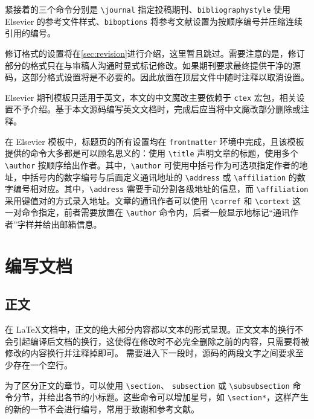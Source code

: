 紧接着的三个命令分别是 \verb|\journal| 指定投稿期刊、\verb|bibliographystyle| 使用 Elsevier 的参考文件样式、\verb|biboptions| 将参考文献设置为按顺序编号并压缩连续引用的编号。


修订格式的设置将在\cref{sec:revision}进行介绍，这里暂且跳过。需要注意的是，修订部分的格式只在与审稿人沟通时显式标记修改。如果期刊要求最终提供干净的源码，这部分格式设置将是不必要的。因此放置在顶层文件中随时注释以取消设置。


Elsevier 期刊模板只适用于英文，本文的中文魔改主要依赖于 \verb|ctex| 宏包，相关设置不予介绍。基于本文源码编写英文文档时，完成后应当将中文魔改部分删除或注释。


在 Elsevier 模板中，标题页的所有设置均在 \verb|frontmatter| 环境中完成，且该模板提供的命令大多都是可以顾名思义的：使用 \verb|\title| 声明文章的标题，使用多个 \verb|\author| 按顺序给出作者。其中，\verb|\author| 可使用中括号作为可选项指定作者的地址，中括号内的数字编号与后面定义通讯地址的 \verb|\address| 或 \verb|\affiliation| 的数字编号相对应。其中，\verb|\address| 需要手动分割各级地址的信息，而 \verb|\affiliation| 采用键值对的方式录入地址。文章的通讯作者可以使用 \verb|\corref| 和 \verb|\cortext| 这一对命令指定，前者需要放置在 \verb|\author| 命令内，后者一般显示地标记“通讯作者”字样并给出邮箱信息。




\section{编写文档} \label{sec:context}

\subsection{正文} \label{subsec:text}

在 \LaTeX 文档中，正文的绝大部分内容都以文本的形式呈现。正文文本的换行不会引起编译后文档的换行，这使得在修改时不必完全删除之前的内容，只需要将被修改的内容换行并注释掉即可。
需要进入下一段时，源码的两段文字之间要求至少存在一个空行。


为了区分正文的章节，可以使用 \verb|\section|、 \verb|subsection| 或 \verb|\subsubsection| 命令分节，并给出各节的小标题。这些命令可以增加星号，如 \verb|\section*|，这样产生的新的一节不会进行编号，常用于致谢和参考文献。


